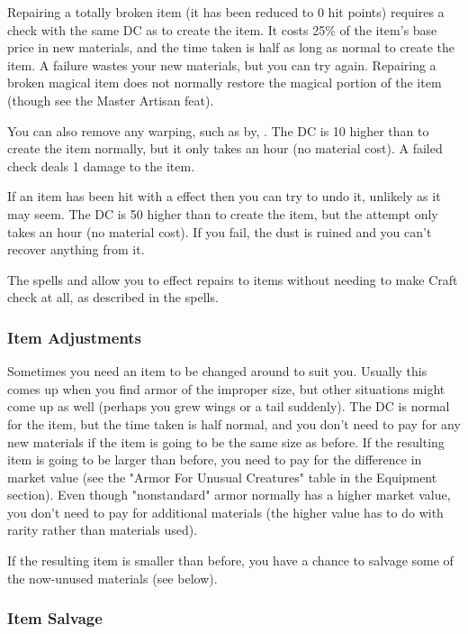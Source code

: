 Repairing a totally broken item (it has been reduced to 0 hit points) requires a check with the same DC as to create the item. It costs 25\% of the item's base price in new materials, and the time taken is half as long as normal to create the item. A failure wastes your new materials, but you can try again. Repairing a broken magical item does not normally restore the magical portion of the item (though see the Master Artisan feat).

You can also remove any warping, such as by, . The DC is 10 higher than to create the item normally, but it only takes an hour (no material cost). A failed check deals 1 damage to the item.

If an item has been hit with a  effect then you can try to undo it, unlikely as it may seem. The DC is 50 higher than to create the item, but the attempt only takes an hour (no material cost). If you fail, the dust is ruined and you can't recover anything from it.

The spells  and  allow you to effect repairs to items without needing to make Craft check at all, as described in the spells.

\subsubsection{Item Adjustments}

Sometimes you need an item to be changed around to suit you. Usually this comes up when you find armor of the improper size, but other situations might come up as well (perhaps you grew wings or a tail suddenly). The DC is normal for the item, but the time taken is half normal, and you don't need to pay for any new materials if the item is going to be the same size as before. If the resulting item is going to be larger than before, you need to pay for the difference in market value (see the "Armor For Unusual Creatures" table in the Equipment section). Even though "nonstandard" armor normally has a higher market value, you don't need to pay for additional materials (the higher value has to do with rarity rather than materials used).

If the resulting item is smaller than before, you have a chance to salvage some of the now-unused materials (see below).

\subsubsection{Item Salvage}


